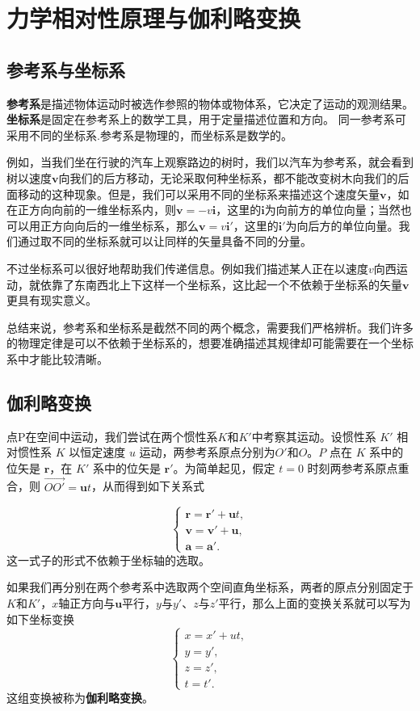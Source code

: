 \section{力学相对性原理与伽利略变换}
\subsection{参考系与坐标系}
\textbf{参考系}是描述物体运动时被选作参照的物体或物体系，它决定了运动的观测结果。
\textbf{坐标系}是固定在参考系上的数学工具，用于定量描述位置和方向。
同一参考系可采用不同的坐标系.参考系是物理的，而坐标系是数学的。

例如，当我们坐在行驶的汽车上观察路边的树时，我们以汽车为参考系，就会看到树以速度$\mathbf v$向我们的后方移动，无论采取何种坐标系，都不能改变树木向我们的后面移动的这种现象。但是，我们可以采用不同的坐标系来描述这个速度矢量$\mathbf v$，如在正方向向前的一维坐标系内，则$\mathbf v = - v \mathbf i$，这里的$\mathbf i$为向前方的单位向量；当然也可以用正方向向后的一维坐标系，那么$\mathbf v = v \mathbf i '$，这里的$\mathbf{ i } '$为向后方的单位向量。我们通过取不同的坐标系就可以让同样的矢量具备不同的分量。

不过坐标系可以很好地帮助我们传递信息。例如我们描述某人正在以速度$v$向西运动，就依靠了东南西北上下这样一个坐标系，这比起一个不依赖于坐标系的矢量$\mathbf v$更具有现实意义。

总结来说，参考系和坐标系是截然不同的两个概念，需要我们严格辨析。我们许多的物理定律是可以不依赖于坐标系的，想要准确描述其规律却可能需要在一个坐标系中才能比较清晰。
\subsection{伽利略变换}
点P在空间中运动，我们尝试在两个惯性系$K$和$K'$中考察其运动。设惯性系 \( K' \) 相对惯性系 \( K \) 以恒定速度 \( u \) 运动，两参考系原点分别为$O'$和$O$。\( P \) 点在 \( K \) 系中的位矢是 \( \mathbf{r} \)，在 \( K' \) 系中的位矢是 \( \mathbf{r}' \)。为简单起见，假定 \( t = 0 \) 时刻两参考系原点重合，则 \( \overrightarrow{OO'} = \mathbf{u} t \)，从而得到如下关系式

\[
\begin{cases} 
\mathbf{r} = \mathbf{r}' + \mathbf{u} t, \\ 
\mathbf{v} = \mathbf{v}' + \mathbf{u}, \\ 
\mathbf{a} = \mathbf{a}'.
\end{cases}
\]
这一式子的形式不依赖于坐标轴的选取。

如果我们再分别在两个参考系中选取两个空间直角坐标系，两者的原点分别固定于$K$和$K'$，$x$轴正方向与$\mathbf u$平行，$y$与$y'$、$z$与$z'$平行，那么上面的变换关系就可以写为如下坐标变换
\[\begin{cases} 
x = x' + ut, \\ 
y = y', \\ 
z = z', \\ 
t = t'. 
\end{cases}\]
这组变换被称为\textbf{伽利略变换}。
